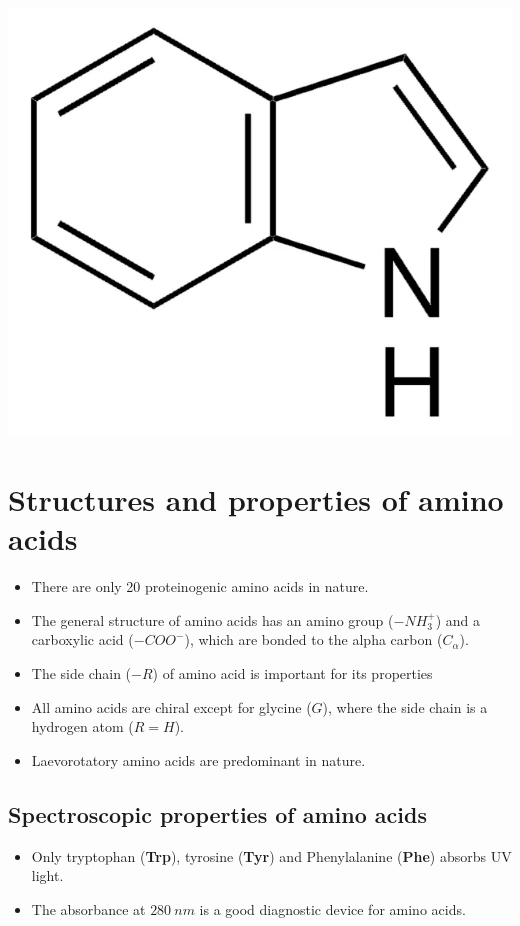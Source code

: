 \documentclass[11pt]{article}
\begin{document}
\begin{center}
\includegraphics[scale=0.3]{./images/indole.png}
\end{center}

\newpage

\section{Structures and properties of amino acids}
\label{sec:orge7a541d}
\begin{itemize}
\item There are only 20 proteinogenic amino acids in nature.
\item The general structure of amino acids has an amino group (\(-NH_3^+\)) and a carboxylic acid (\(-COO^-\)), which are bonded to the alpha carbon (\(C_{\alpha}\)).
\item The side chain (\(-R\)) of amino acid is important for its properties
\item All amino acids are chiral except for glycine (\(G\)), where the side chain is a hydrogen atom (\(R = H\)).
\item Laevorotatory amino acids are predominant in nature.
\end{itemize}

\subsection{Spectroscopic properties of amino acids}
\label{sec:org623fff8}
\begin{itemize}
\item Only tryptophan (\textbf{Trp}), tyrosine (\textbf{Tyr}) and Phenylalanine (\textbf{Phe}) absorbs UV light.
\item The absorbance at \(\qty{280}{\unit{nm}}\) is a good diagnostic device for amino acids.
\end{itemize}
\end{document}
